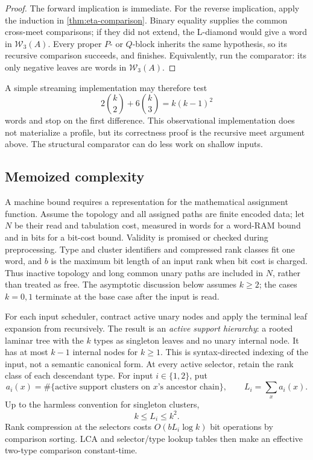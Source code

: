 \begin{proof}
The forward implication is immediate.  For the reverse implication, apply
the induction in \autoref{thm:eta-comparison}.  Binary equality supplies the
common cross-meet comparisons; if they did not extend, the L-diamond would
give a word in \(\mathcal W_3(A)\).  Every proper \(P\)- or \(Q\)-block
inherits the same hypothesis, so its recursive comparison succeeds, and
 finishes.  Equivalently, run the comparator:
its only negative leaves are words in \(\mathcal W_3(A)\).
\end{proof}

A simple streaming implementation may therefore test
\begin{equation}
 2\binom{k}{2}+6\binom{k}{3}=k(k-1)^2
 \label{eq:eta-stream-count}
\end{equation}
words and stop on the first difference.  This observational implementation
does not materialize a profile, but its correctness proof is the recursive
meet argument above.  The structural comparator can do less work on shallow
inputs.

\subsection{Memoized complexity}
\label{sec:eta-complexity}

A machine bound requires a representation for the mathematical assignment
function.  Assume the topology and all assigned paths are finite encoded data;
let \(N\) be their read and tabulation cost, measured in words for a word-RAM
bound and in bits for a bit-cost bound.  Validity is promised or checked during
preprocessing.  Type and cluster identifiers and compressed rank classes fit
one word, and \(b\) is the maximum bit length of an input rank when bit cost is
charged.  Thus inactive topology and long common unary paths are included in
\(N\), rather than treated as free.  The asymptotic discussion below assumes
\(k\ge2\); the cases \(k=0,1\) terminate at the base case after the input is
read.

For each input scheduler, contract active unary nodes and apply the terminal
leaf expansion from  recursively.  The result is an
\emph{active support hierarchy}: a rooted laminar tree with the \(k\) types as
singleton leaves and no unary internal node.  It has at most \(k-1\) internal
nodes for \(k\ge1\).  This is syntax-directed indexing of the input, not a
semantic canonical form.  At every active selector, retain the rank class of
each descendant type.  For input \(i\in\{1,2\}\), put
\begin{equation}
 a_i(x)=\#\{\text{active support clusters on \(x\)'s ancestor chain}\},
 \qquad
 L_i=\sum_x a_i(x).
 \label{eq:eta-L}
\end{equation}
Up to the harmless convention for singleton clusters,
\begin{equation}
  k\le L_i\le k^2.
 \label{eq:eta-L-range}
\end{equation}
Rank compression at the selectors costs
\(O(bL_i\log k)\) bit operations by comparison sorting.  LCA and
selector/type lookup tables then make an effective two-type comparison
constant-time.

